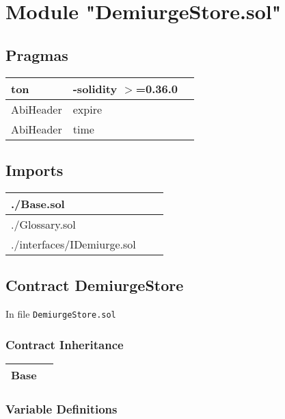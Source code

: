 
\section{Module "DemiurgeStore.sol"}


\subsection{Pragmas}


\noindent\begin{tabular}{|l|l|p{5cm}|}\hline
ton & -solidity $>$=0.36.0 &\\\hline
AbiHeader &  expire &\\\hline
AbiHeader &  time &\\\hline
\end{tabular}


\subsection{Imports}


\noindent\begin{tabular}{|l|l|p{5cm}|}\hline
./Base.sol &\\\hline
./Glossary.sol &\\\hline
./interfaces/IDemiurge.sol &\\\hline
\end{tabular}


\subsection{Contract DemiurgeStore}

\minitoc

In file {\tt DemiurgeStore.sol}

\subsubsection{Contract Inheritance}


\noindent\begin{tabular}{|l|p{5cm}|}\hline
Base & \\\hline
\end{tabular}


\subsubsection{Variable Definitions}


